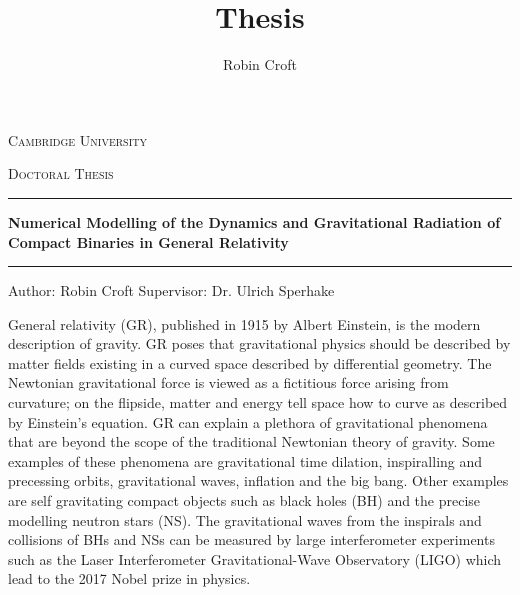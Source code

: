\documentclass[11pt]{report}  %
\title{Thesis}
\author{Robin Croft}
\numberwithin{equation}{section}
\begin{document}
\begin{titlepage}
  \centering
  
  \centering
  {\scshape\LARGE Cambridge University \par}
  \vspace{1cm}
  {\scshape\Large Doctoral Thesis \par} 
    \vspace{2cm} 
    \hrule
    \vspace{0.3cm}
  {\Large\itshape \par}
  {\huge\bfseries Numerical Modelling of the Dynamics and Gravitational Radiation of Compact Binaries in General Relativity\par} \vspace{0.3cm}
  \hrule
  \vfill
   Author: Robin Croft
\vfill
  Supervisor: Dr. Ulrich Sperhake
  \vfill

    \begin{figure}[h!]
  \centering
\end{figure}


\end{titlepage}						%


\abstract 
\vspace{2cm} 
General relativity (GR), published in 1915 by Albert Einstein, is the modern description of gravity. GR poses that gravitational physics should be described by matter fields existing in a curved space described by differential geometry. The Newtonian gravitational force is viewed as a fictitious force arising from curvature; on the flipside, matter and energy tell space how to curve as described by Einstein's equation. GR can explain a plethora of gravitational phenomena that are beyond the scope of the traditional Newtonian theory of gravity. Some examples of these phenomena are gravitational time dilation, inspiralling and precessing orbits, gravitational waves, inflation and the big bang. Other examples are self gravitating compact objects such as black holes (BH) and the precise modelling neutron stars (NS). The gravitational waves from the inspirals and collisions of BHs and NSs can be measured by large interferometer experiments such as the Laser Interferometer Gravitational-Wave Observatory (LIGO) which lead to the 2017 Nobel prize in physics.  
\end{document}

